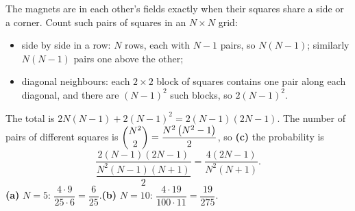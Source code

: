 The magnets are in each other's fields exactly when their squares share a side or a corner. Count such pairs of squares in an $N\times N$ grid:
\begin{itemize}
\item side by side in a row: $N$ rows, each with $N-1$ pairs, so $N(N-1)$; similarly $N(N-1)$ pairs one above the other;
\item diagonal neighbours: each $2\times2$ block of squares contains one pair along each diagonal, and there are $(N-1)^2$ such blocks, so $2(N-1)^2$.
\end{itemize}
The total is $2N(N-1)+2(N-1)^2=2(N-1)(2N-1)$. The number of pairs of different squares is $\dbinom{N^2}{2}=\dfrac{N^2\left(N^2-1\right)}{2}$, so \textbf{(c)} the probability is
\[\dfrac{2(N-1)(2N-1)}{\dfrac{N^2(N-1)(N+1)}{2}}=\boxed{\dfrac{4(2N-1)}{N^2(N+1)}}.\]
\textbf{(a)} $N=5$: $\dfrac{4\cdot9}{25\cdot6}=\boxed{\dfrac{6}{25}}$.\qquad\textbf{(b)} $N=10$: $\dfrac{4\cdot19}{100\cdot11}=\boxed{\dfrac{19}{275}}$.
